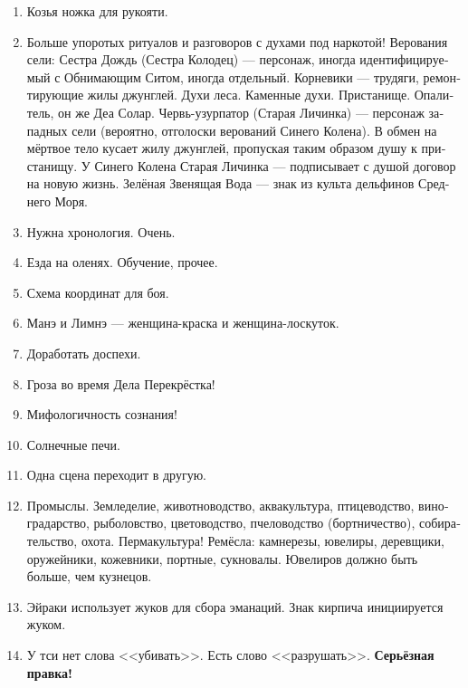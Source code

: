 \documentclass[a4paper,12pt,fleqn]{book}\usepackage{polyglossia}\setdefaultlanguage[babelshorthands=true]{russian}\setotherlanguage{english}\defaultfontfeatures{Ligatures=TeX,Mapping=tex-text}\usepackage{xcolor}\newcommand{\ml}[3]{#2}
\begin{document}
{\begin{enumerate}
\item Козья ножка для рукояти.

\item Больше упоротых ритуалов и разговоров с духами под наркотой!
Верования сели: Сестра Дождь (Сестра Колодец) --- персонаж, иногда идентифицируемый с Обнимающим Ситом, иногда отдельный.
Корневики --- трудяги, ремонтирующие жилы джунглей.
Духи леса.
Каменные духи.
Пристанище.
Опалитель, он же Деа Солар.
Червь-узурпатор (Старая Личинка) --- персонаж западных сели (вероятно, отголоски верований Синего Колена).
В обмен на мёртвое тело кусает жилу джунглей, пропуская таким образом душу к пристанищу.
У Синего Колена Старая Личинка --- подписывает с душой договор на новую жизнь.
Зелёная Звенящая Вода --- знак из культа дельфинов Среднего Моря.

\item Нужна хронология.
Очень.

\item Езда на оленях.
Обучение, прочее.

\item Схема координат для боя.

\item Манэ и Лимнэ --- женщина-краска и женщина-лоскуток.

\item Доработать доспехи.

\item Гроза во время Дела Перекрёстка!

\item Мифологичность сознания!

\item Солнечные печи.

\item Одна сцена переходит в другую.

\item Промыслы.
Земледелие, животноводство, аквакультура, птицеводство, виноградарство, рыболовство, цветоводство, пчеловодство (бортничество), собирательство, охота.
Пермакультура!
Ремёсла: камнерезы, ювелиры, деревщики, оружейники, кожевники, портные, сукновалы.
Ювелиров должно быть больше, чем кузнецов.

\item Эйраки использует жуков для сбора эманаций.
Знак кирпича инициируется жуком.

\item У тси нет слова <<убивать>>.
Есть слово <<разрушать>>.
\textbf{Серьёзная правка!}


\end{enumerate}}
\end{document}
